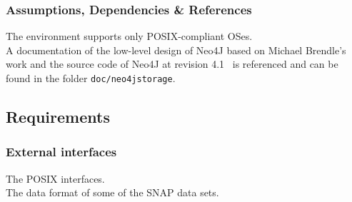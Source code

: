 	\subsubsection{Assumptions, Dependencies \& References}
		The environment supports only POSIX-compliant OSes. \\
		A documentation of the low-level design of Neo4J based on Michael Brendle's work and the source code of Neo4J at revision 4.1~\autocite{GitHubneo4j} is referenced and can be found in the folder \texttt{doc/neo4jstorage}.



\subsection{Requirements}
	\subsubsection{External interfaces}
	The POSIX interfaces. \\
	The data format of some of the SNAP data sets. \\

